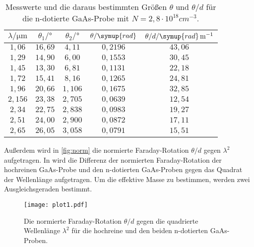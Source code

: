 \begin{table}[hbt!]
  \centering
  \caption{Messwerte und die daraus bestimmten Größen $\theta$ und $\theta/d$ für die n-dotierte GaAs-Probe
  mit $N=2,8 \cdot 10^{18} \si{cm}^{-3}$.}
  \label{tab:m3}
  \begin{tabular}{c c c c c}
    \toprule
    $\lambda/\si{\micro\meter}$ & $\theta_{1}/\si{\degree}$ & $\theta_{2}/\si{\degree}$ & $\theta/\symup{rad}$ & $\theta/d/\symup{rad}\, \si{m}^{-1}$\\
    \midrule
    $1,06 $ & $16,69$ & $4,11$  & $0,2196$ & $43,06$ \\
    $1,29 $ & $14,90$ & $6,00$  & $0,1553$ & $30,45$ \\
    $1,45 $ & $13,30$ & $6,81$  & $0,1131$ & $22,18$ \\
    $1,72 $ & $15,41$ & $8,16$  & $0,1265$ & $24,81$ \\
    $1,96 $ & $20,66$ & $1,106$ & $0,1675$ & $32,85$ \\
    $2,156$ & $23,38$ & $2,705$ & $0,0639$ & $12,54$ \\
    $2,34 $ & $22,75$ & $2,838$ & $0,0983$ & $19,27$ \\
    $2,51 $ & $24,00$ & $2,900$ & $0,0872$ & $17,11$ \\
    $2,65 $ & $26,05$ & $3,058$ & $0,0791$ & $15,51$ \\
    \bottomrule
  \end{tabular}
\end{table}
Außerdem wird in \autoref{fig:norm} die normierte Faraday-Rotation $\theta/d$ gegen $\lambda^2$ aufgetragen.
In wird die Differenz der normierten Faraday-Rotation der hochreinen GaAs-Probe und den n-dotierten GaAs-Proben
gegen das Quadrat der Wellenlänge aufgetragen. Um die effektive Masse zu bestimmen, werden zwei Ausgleichsgeraden
bestimmt.
\begin{figure}[hbt!]
  \label{fig:norm}
  \texttt{[image: plot1.pdf]}
  \caption{Die normierte Faraday-Rotation $\theta/d$ gegen die quadrierte Wellenlänge $\lambda^2$ für die
  hochreine und den beiden n-dotierten GaAs-Proben.}
\end{figure}